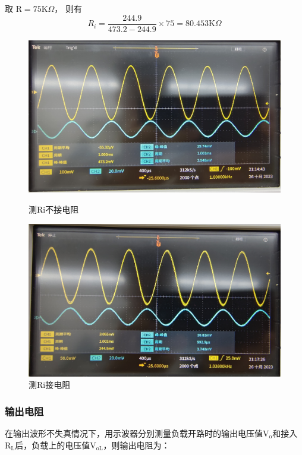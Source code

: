 \documentclass[a4paper]{article}
\theoremstyle{definition}
\theoremstyle{plain}
\theoremstyle{remark}
\begin{document}
取 $\mathrm{R=75K}\Omega$， 则有
$$R_i = \frac{244.9}{473.2-244.9}\times 75 = 80.453\mathrm{K}\Omega$$
\begin{figure}[H]
	\begin{minipage}[t]{0.5\linewidth}
		\centering
		\includegraphics[width=1\textwidth]{测Ri不接电阻}
		\caption{测Ri不接电阻}
		\label{测Ri不接电阻}
	\end{minipage}%
	\begin{minipage}[t]{0.5\linewidth}
		\centering
		\includegraphics[width=1\textwidth]{测Ri接电阻}
		\caption{测Ri接电阻}
		\label{测Ri接电阻}
	\end{minipage}
\end{figure}

\subsubsection{输出电阻}
在输出波形不失真情况下，用示波器分别测量负载开路时的输出电压值$\mathrm{V_o}$和接入$\mathrm{R_L}$后，负载上的电压值$\mathrm{V_{oL}}$，则输出电阻为：
\end{document}
